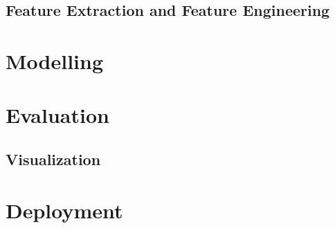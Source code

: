 	\subsection{Feature Extraction and Feature Engineering}

\section{Modelling}
\section{Evaluation}
	\subsection{Visualization}
\section{Deployment}